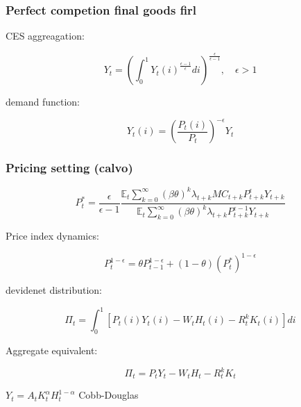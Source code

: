 \documentclass[11pt,preprint]{elsarticle}
\numberwithin{equation}{section}
\numberwithin{figure}{section}
\numberwithin{table}{section}
\begin{document}
\subsubsection{Perfect competion final goods
firl}\label{perfect-competion-final-goods-firl}

CES aggreagation:

\begin{equation}
Y_t = \left( \int_0^1 Y_t(i)^{\frac{\epsilon-1}{\epsilon}} di \right)^{\frac{\epsilon}{\epsilon-1}}, \quad \epsilon > 1
\label{ces_aggregator}
\end{equation}

demand function:

\begin{equation}
Y_t(i) = \left( \frac{P_t(i)}{P_t} \right)^{-\epsilon} Y_t
\label{demand_curve}
\end{equation}

\subsubsection{Pricing setting (calvo)}\label{pricing-setting-calvo}

\begin{equation}
P_t^* = \frac{\epsilon}{\epsilon-1} \frac{
\mathbb{E}_t \sum_{k=0}^{\infty} (\beta\theta)^k \lambda_{t+k} MC_{t+k} P_{t+k}^{\epsilon} Y_{t+k}
}{
\mathbb{E}_t \sum_{k=0}^{\infty} (\beta\theta)^k \lambda_{t+k} P_{t+k}^{\epsilon-1} Y_{t+k}
}
\label{optimal_price}
\end{equation}

Price index dynamics:

\begin{equation}
P_t^{1-\epsilon} = \theta P_{t-1}^{1-\epsilon} + (1-\theta)(P_t^*)^{1-\epsilon}
\label{price_index}
\end{equation}

devidenet distribution:

\begin{equation}
\Pi_t = \int_0^1 \left[ P_t(i)Y_t(i) - W_t H_t(i) - R_t^k K_t(i) \right] di
\label{dividends}
\end{equation}

Aggregate equivalent:

\begin{equation}
\Pi_t = P_t Y_t - W_t H_t - R_t^k K_t
\label{agg_dividends}
\end{equation}

\(Y_t = A_t K_t^\alpha H_t^{1-\alpha}\) Cobb-Douglas
\end{document}
